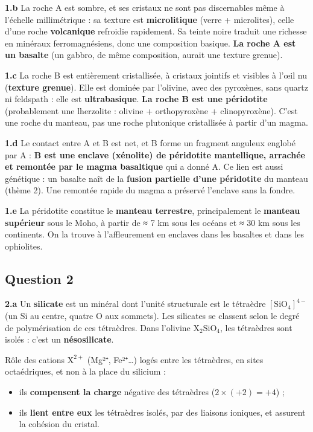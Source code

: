 \documentclass[11pt,a4paper]{article}
\providecommand{\tightlist}{\setlength{\itemsep}{0pt}\setlength{\parskip}{0pt}}
\begin{document}
\textbf{1.b} La roche A est sombre, et ses cristaux ne sont pas discernables même à l'échelle millimétrique : sa texture est \textbf{microlitique} (verre + microlites), celle d'une roche \textbf{volcanique} refroidie rapidement. Sa teinte noire traduit une richesse en minéraux ferromagnésiens, donc une composition basique. \textbf{La roche A est un basalte} (un gabbro, de même composition, aurait une texture grenue).

\textbf{1.c} La roche B est entièrement cristallisée, à cristaux jointifs et visibles à l'œil nu (\textbf{texture grenue}). Elle est dominée par l'olivine, avec des pyroxènes, sans quartz ni feldspath : elle est \textbf{ultrabasique}. \textbf{La roche B est une péridotite} (probablement une lherzolite : olivine + orthopyroxène + clinopyroxène). C'est une roche du manteau, pas une roche plutonique cristallisée à partir d'un magma.

\textbf{1.d} Le contact entre A et B est net, et B forme un fragment anguleux englobé par A : \textbf{B est une enclave (xénolite) de péridotite mantellique, arrachée et remontée par le magma basaltique} qui a donné A. Ce lien est aussi génétique : un basalte naît de la \textbf{fusion partielle d'une péridotite} du manteau (thème 2). Une remontée rapide du magma a préservé l'enclave sans la fondre.

\textbf{1.e} La péridotite constitue le \textbf{manteau terrestre}, principalement le \textbf{manteau supérieur} sous le Moho, à partir de ≈ 7 km sous les océans et ≈ 30 km sous les continents. On la trouve à l'affleurement en enclaves dans les basaltes et dans les ophiolites.

\hypertarget{question-2}{%
\subsection{Question 2}\label{question-2}}

\textbf{2.a} Un \textbf{silicate} est un minéral dont l'unité structurale est le tétraèdre \([\mathrm{SiO_4}]^{4-}\) (un Si au centre, quatre O aux sommets). Les silicates se classent selon le degré de polymérisation de ces tétraèdres. Dans l'olivine \(\mathrm{X_2SiO_4}\), les tétraèdres sont isolés : c'est un \textbf{nésosilicate}.

Rôle des cations \(\mathrm{X^{2+}}\) (Mg²⁺, Fe²⁺\ldots) logés entre les tétraèdres, en sites octaédriques, et non à la place du silicium :

\begin{itemize}
\tightlist
\item
  ils \textbf{compensent la charge} négative des tétraèdres (\(2 \times (+2) = +4\)) ;
\item
  ils \textbf{lient entre eux} les tétraèdres isolés, par des liaisons ioniques, et assurent la cohésion du cristal.
\end{itemize}
\end{document}
